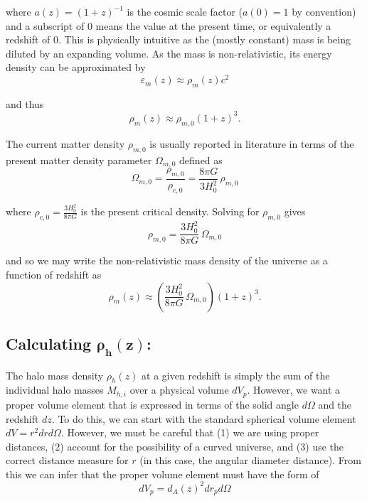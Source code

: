 \documentclass[%
 reprint,
 amsmath,amssymb,
 aps,nofootinbib
]{revtex4-1}
\begin{document}
\noindent where $a(z)=(1+z)^{-1}$ is the cosmic scale factor (${a(0)=1}$ by convention) and a subscript of 0 means the value at the present time, or equivalently a redshift of 0. This is physically intuitive as the (mostly constant) mass is being diluted by an expanding volume. As the mass is non-relativistic, its energy density can be approximated by
\begin{equation*}\label{energy_mass}
\varepsilon_m(z)\approx\rho_m(z)c^2
\end{equation*}

\noindent and thus
\begin{equation}\label{mass_evol}
\rho_m(z)\approx\rho_{m,0}(1+z)^3.
\end{equation}

The current matter density $\rho_{m,0}$ is usually reported in literature in terms of the present matter density parameter $\Omega_{m,0}$ defined as
\begin{equation}\label{}
\Omega_{m,0}=\frac{\rho_{m,0}}{\rho_{c,0}}=\frac{8\pi G}{3H_0^2}\,\rho_{m,0}
\end{equation}

\noindent where $\rho_{c,0}=\frac{3H_0^2}{8\pi G}$ is the present critical density. Solving for $\rho_{m,0}$ gives
\begin{equation*}\label{}
\rho_{m,0}=\frac{3H_0^2}{8\pi G}\,\Omega_{m,0}
\end{equation*}

\noindent and so we may write the non-relativistic mass density of the universe as a function of redshift as
\begin{equation}\label{rho}
\rho_m(z)\approx\left(\frac{3H_0^2}{8\pi G}\,\Omega_{m,0}\right)(1+z)^3.
\end{equation}

\subsection*{Calculating $\mathbf{\rho_h(z)}$:}

The halo mass density $\rho_h(z)$ at a given redshift is simply the sum of the individual halo masses $M_{h,i}$ over a physical volume $dV_p$. However, we want a proper volume element that is expressed in terms of the solid angle $d\Omega$ and the redshift $dz$. To do this, we can start with the standard spherical volume element $dV=r^2drd\Omega$. However, we must be careful that (1) we are using proper distances, (2) account for the possibility of a curved universe, and (3) use the correct distance measure for $r$ (in this case, the angular diameter distance). From this we can infer that the proper volume element must have the form of
\begin{equation}\label{proper_element}
dV_p=d_A(z)^2dr_pd\Omega
\end{equation}
\end{document}
